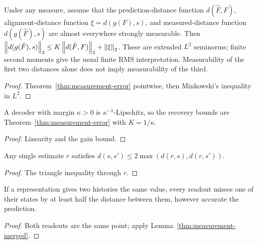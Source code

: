 \begin{corollary}\label{thm:measurement-rms}
  \leanok
  Under any measure, assume that the prediction-distance function
  $d(\hat F,F)$, alignment-distance function $\xi=d(g(F),s)$, and
  measured-distance function $d(g(\hat F),s)$ are almost everywhere strongly
  measurable. Then
  $\left\lVert d(g(\hat F),s)\right\rVert_2\le K\left\lVert d(\hat F,F)\right\rVert_2+\left\lVert\xi\right\rVert_2$.
  These are extended $L^2$ seminorms; finite second moments give the usual
  finite RMS interpretation. Measurability of the first two distances alone
  does not imply measurability of the third.
\end{corollary}
\begin{proof}\leanok
  Theorem~\ref{thm:measurement-error} pointwise, then Minkowski's inequality in
  $L^2$.
\end{proof}

\begin{lemma}\label{thm:measurement-decoder}
  \leanok
  A decoder with margin $\kappa>0$ is $\kappa^{-1}$-Lipschitz, so the
  recovery bounds are Theorem~\ref{thm:measurement-error} with $K=1/\kappa$.
\end{lemma}
\begin{proof}\leanok
  Linearity and the gain bound.
\end{proof}

\begin{lemma}\label{thm:measurement-merged}
  \leanok
  Any single estimate $r$ satisfies $d(s,s')\le2\max(d(r,s),d(r,s'))$.
\end{lemma}
\begin{proof}\leanok
  The triangle inequality through $r$.
\end{proof}

\begin{theorem}\label{thm:measurement-lower}
  \leanok
  If a representation gives two histories the same value, every readout
  misses one of their states by at least half the distance between them,
  however accurate the prediction.
\end{theorem}
\begin{proof}\leanok
  Both readouts are the same point; apply Lemma~\ref{thm:measurement-merged}.
\end{proof}

